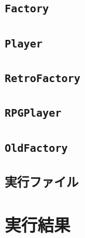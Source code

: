 \documentclass[uplatex]{jsarticle}
\begin{document}
\subsection{{\tt Factory}}


\subsection{{\tt Player}}


\subsection{{\tt RetroFactory}}


\newpage

\subsection{{\tt RPGPlayer}}


\subsection{{\tt OldFactory}}


\newpage

\subsection{実行ファイル}




\section{実行結果}



\end{document}
